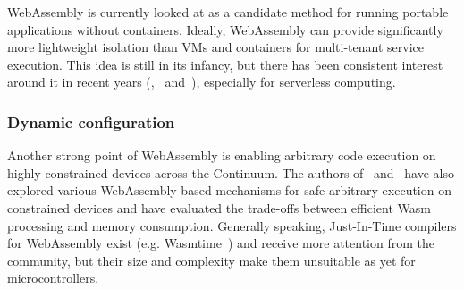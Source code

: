 


WebAssembly is currently looked at as a candidate method for running portable applications without containers. Ideally, WebAssembly can provide significantly more lightweight isolation than VMs and containers for multi-tenant service execution. This idea is still in its infancy, but there has been consistent interest around it in recent years (\cite{hall2019execution},~\cite{gadepalli2020sledge} and~\cite{shillaker2020faasm}), especially for serverless computing.

\subsubsection{Dynamic configuration}

Another strong point of WebAssembly is enabling arbitrary code execution on highly constrained devices across the Continuum. The authors of~\cite{10.1007/978-3-030-29897-5_33} and~\cite{peach2020ewasm} have also explored various WebAssembly-based mechanisms for safe arbitrary execution on constrained devices and have evaluated the trade-offs between efficient Wasm processing and memory consumption. Generally speaking, Just-In-Time compilers for WebAssembly exist (e.g. Wasmtime~\cite{wasmtime}) and receive more attention from the community, but their size and complexity make them unsuitable as yet for microcontrollers.

